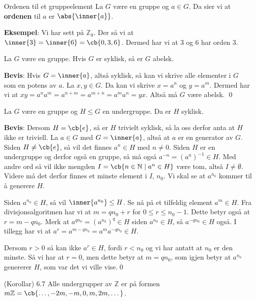 \begin{definition}{Ordenen til et gruppeelement}{}
	La $G$ være en gruppe og $a \in G$. Da sier vi at \textbf{ordenen} til $a$ er
	$\abs{\inner{a}}$.
\end{definition}

\textbf{Eksempel}: Vi har sett på $\mathbb{Z}_9$. Der så vi at
$\inner{3} = \inner{6} = \cb{0, 3, 6}$. Dermed har vi at 3 og 6 har orden 3.

\begin{theorem*}{6.1}{}
	La $G$ være en gruppe. Hvis $G$ er syklisk, så er $G$ abelsk.
\end{theorem*}

\textbf{Bevis}: Hvis $G = \inner{a}$, altså syklisk, så kan vi skrive alle elementer
i $G$ som en potens av $a$. La $x, y \in G$. Da kan vi skrive $x = a^n$ og $y = a^m$.
Dermed har vi at $xy = a^na^m = a^{n+m} = a^{m+n} = a^ma^n = yx$. Altså må $G$ være
abelsk. \qed


\begin{theorem*}{}{}
	La $G$ være en gruppe og $H \leq G$ en undergruppe. Da er $H$ syklisk.
\end{theorem*}

\textbf{Bevis}:
Dersom $H = \cb{e}$, så er $H$ trivielt syklisk, så la oss derfor anta at $H$ ikke
er triviell. La $a \in G$ med $G = \inner{a}$, altså at $a$ er en generator av $G$.
Siden $H \neq \cb{e}$, så vil det finnes $a^n \in H$ med $n \neq 0$. Siden $H$ er en
undergruppe og derfor også en gruppe, så må også $a^{-n} = (a^n)^{-1} \in H$. Med andre
ord så vil ikke mengden $I=\cb{n \in \mathbb{N}\mid a^n \in H}$ være tom, altså
$I \neq \emptyset$. Videre må det derfor finnes et minste element i $I$, $n_0$. Vi
skal se at $a^{n_0}$ kommer til å generere $H$.

Siden $a^{n_0} \in H$, så vil $\inner{a^{n_0}} \leq H$. Se nå på et tilfeldig
element $a^m \in H$. Fra divisjonsalgoritmen har vi at $m = qn_0 + r$ for
$0 \leq r \leq n_0-1$. Dette betyr også at $r = m - qn_0$. Merk at
$a^{qn_0} = (a^{n_0})^q \in H$ siden $a^{n_0}\in H$, så $a^{-qn_0}\in H$ også. I
tillegg har vi at $a^r=a^{m-qn_0}=a^ma^{-qn_0}\in H$.

Dersom $r > 0$ så kan ikke $a^r \in H$, fordi $r<n_0$ og vi har antatt at $n_0$ er
den minste. Så vi har at $r = 0$, men dette betyr at $m = qn_0$, som igjen betyr at
$a^{n_0}$ genererer $H$, som var det vi ville vise.\qed

\begin{theorem*}{(Korollar) 6.7}{}
	Alle undergrupper av $\mathbb{Z}$ er på formen
	$m \mathbb{Z} = \cb{\dots, -2m, -m, 0, m, 2m, \dots}$.
\end{theorem*}

